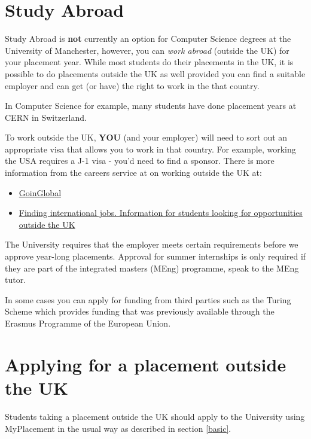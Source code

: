 \documentclass[
]{book}
\providecommand{\tightlist}{%
  \setlength{\itemsep}{0pt}\setlength{\parskip}{0pt}}
\begin{document}
\section{Study Abroad}\label{abroad}

Study Abroad is \textbf{not} currently an option for Computer Science degrees at the University of Manchester, however, you can \emph{work abroad} (outside the UK) for your placement year. While most students do their placements in the UK, it is possible to do placements outside the UK as well provided you can find a suitable employer and can get (or have) the right to work in the that country.

In Computer Science for example, many students have done placement years at CERN in Switzerland. \citep{cern}

To work outside the UK, \textbf{YOU} (and your employer) will need to sort out an appropriate visa that allows you to work in that country. For example, working the USA requires a J-1 visa - you'd need to find a sponsor. There is more information from the careers service at on working outside the UK at:

\begin{itemize}
\tightlist
\item
  \href{https://www.careers.manchester.ac.uk/international/goinglobal/}{GoinGlobal} \citep{goinglobal}
\item
  \href{https://www.careers.manchester.ac.uk/international/internationaljobs/}{Finding international jobs. Information for students looking for opportunities outside the UK} \citep{interjobs}
\end{itemize}

The University requires that the employer meets certain requirements before we approve year-long placements. Approval for summer internships is only required if they are part of the integrated masters (MEng) programme, speak to the MEng tutor.

In some cases you can apply for funding from third parties such as the Turing Scheme which provides funding that was previously available through the Erasmus Programme of the European Union. \citep{turing}

\section{Applying for a placement outside the UK}\label{outside}

Students taking a placement outside the UK should apply to the University using MyPlacement in the usual way as described in section \ref{basic}.
\end{document}
